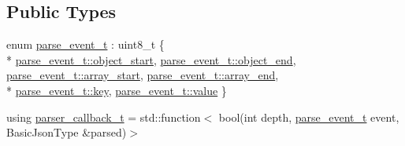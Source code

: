\subsection*{Public Types}
\begin{DoxyCompactItemize}
\item 
enum \hyperlink{classnlohmann_1_1detail_1_1parser_a37ac88c864dda495f72cb62776b0bebe}{parse\+\_\+event\+\_\+t} \+: uint8\+\_\+t \{ \\*
\hyperlink{classnlohmann_1_1detail_1_1parser_a37ac88c864dda495f72cb62776b0bebeae73f17027cb0acbb537f29d0a6944b26}{parse\+\_\+event\+\_\+t\+::object\+\_\+start}, 
\hyperlink{classnlohmann_1_1detail_1_1parser_a37ac88c864dda495f72cb62776b0bebeaf63e2a2468a37aa4f394fcc3bcb8249c}{parse\+\_\+event\+\_\+t\+::object\+\_\+end}, 
\hyperlink{classnlohmann_1_1detail_1_1parser_a37ac88c864dda495f72cb62776b0bebeaa4388a3d92419edbb1c6efd4d52461f3}{parse\+\_\+event\+\_\+t\+::array\+\_\+start}, 
\hyperlink{classnlohmann_1_1detail_1_1parser_a37ac88c864dda495f72cb62776b0bebea49642fb732aa2e112188fba1f9d3ef7f}{parse\+\_\+event\+\_\+t\+::array\+\_\+end}, 
\\*
\hyperlink{classnlohmann_1_1detail_1_1parser_a37ac88c864dda495f72cb62776b0bebea3c6e0b8a9c15224a8228b9a98ca1531d}{parse\+\_\+event\+\_\+t\+::key}, 
\hyperlink{classnlohmann_1_1detail_1_1parser_a37ac88c864dda495f72cb62776b0bebea2063c1608d6e0baf80249c42e2be5804}{parse\+\_\+event\+\_\+t\+::value}
 \}
\item 
using \hyperlink{classnlohmann_1_1detail_1_1parser_ad250ad4f2b4af4a497e727c963162ff1}{parser\+\_\+callback\+\_\+t} = std\+::function$<$ bool(int depth, \hyperlink{classnlohmann_1_1detail_1_1parser_a37ac88c864dda495f72cb62776b0bebe}{parse\+\_\+event\+\_\+t} event, Basic\+Json\+Type \&parsed)$>$
\end{DoxyCompactItemize}
